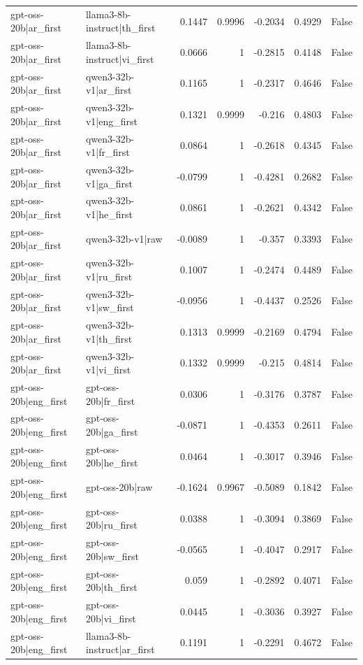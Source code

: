 \begin{table}
\begin{tabular}{l l r r r r l}
gpt-oss-20b|ar_first & llama3-8b-instruct|th_first & 0.1447 & 0.9996 & -0.2034 & 0.4929 & False \\
gpt-oss-20b|ar_first & llama3-8b-instruct|vi_first & 0.0666 & 1 & -0.2815 & 0.4148 & False \\
gpt-oss-20b|ar_first & qwen3-32b-v1|ar_first & 0.1165 & 1 & -0.2317 & 0.4646 & False \\
gpt-oss-20b|ar_first & qwen3-32b-v1|eng_first & 0.1321 & 0.9999 & -0.216 & 0.4803 & False \\
gpt-oss-20b|ar_first & qwen3-32b-v1|fr_first & 0.0864 & 1 & -0.2618 & 0.4345 & False \\
gpt-oss-20b|ar_first & qwen3-32b-v1|ga_first & -0.0799 & 1 & -0.4281 & 0.2682 & False \\
gpt-oss-20b|ar_first & qwen3-32b-v1|he_first & 0.0861 & 1 & -0.2621 & 0.4342 & False \\
gpt-oss-20b|ar_first & qwen3-32b-v1|raw & -0.0089 & 1 & -0.357 & 0.3393 & False \\
gpt-oss-20b|ar_first & qwen3-32b-v1|ru_first & 0.1007 & 1 & -0.2474 & 0.4489 & False \\
gpt-oss-20b|ar_first & qwen3-32b-v1|sw_first & -0.0956 & 1 & -0.4437 & 0.2526 & False \\
gpt-oss-20b|ar_first & qwen3-32b-v1|th_first & 0.1313 & 0.9999 & -0.2169 & 0.4794 & False \\
gpt-oss-20b|ar_first & qwen3-32b-v1|vi_first & 0.1332 & 0.9999 & -0.215 & 0.4814 & False \\
gpt-oss-20b|eng_first & gpt-oss-20b|fr_first & 0.0306 & 1 & -0.3176 & 0.3787 & False \\
gpt-oss-20b|eng_first & gpt-oss-20b|ga_first & -0.0871 & 1 & -0.4353 & 0.2611 & False \\
gpt-oss-20b|eng_first & gpt-oss-20b|he_first & 0.0464 & 1 & -0.3017 & 0.3946 & False \\
gpt-oss-20b|eng_first & gpt-oss-20b|raw & -0.1624 & 0.9967 & -0.5089 & 0.1842 & False \\
gpt-oss-20b|eng_first & gpt-oss-20b|ru_first & 0.0388 & 1 & -0.3094 & 0.3869 & False \\
gpt-oss-20b|eng_first & gpt-oss-20b|sw_first & -0.0565 & 1 & -0.4047 & 0.2917 & False \\
gpt-oss-20b|eng_first & gpt-oss-20b|th_first & 0.059 & 1 & -0.2892 & 0.4071 & False \\
gpt-oss-20b|eng_first & gpt-oss-20b|vi_first & 0.0445 & 1 & -0.3036 & 0.3927 & False \\
gpt-oss-20b|eng_first & llama3-8b-instruct|ar_first & 0.1191 & 1 & -0.2291 & 0.4672 & False \\

\end{tabular}
\end{table}
